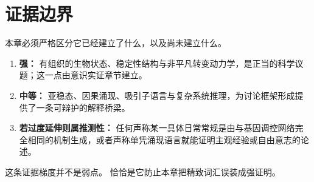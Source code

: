 \section{证据边界}

本章必须严格区分它已经建立了什么，以及尚未建立什么。

\begin{enumerate}[nosep]
  \item \textbf{强：} 有组织的生物状态、稳定性结构与非平凡转变动力学，是正当的科学议题；这一点由意识实证章节建立。
  \item \textbf{中等：} 亚稳态、因果涌现、吸引子语言与复杂系统推理，为讨论框架形成提供了一条可辩护的解释桥梁。
  \item \textbf{若过度延伸则属推测性：} 任何声称某一具体日常常规是由与基因调控网络完全相同的机制生成，或者声称单凭涌现语言就能证明主观经验或自由意志的论述。
\end{enumerate}

\begin{remark}
这条证据梯度并不是弱点。
恰恰是它防止本章把精致词汇误装成强证明。
\end{remark}